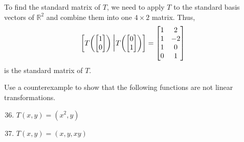 \documentclass{article}
\begin{document}
\begin{enumerate}
\begin{solution}
        To find the standard matrix of \(T\), we need to apply \(T\) to the standard basis vectors of \(\mathbb{R}^2\) and combine them into one \(4\times 2\) matrix. Thus,\[
            \begin{bmatrix}
                T\!\begin{pmatrix}
                    \begin{bmatrix}
                        1\\0
                    \end{bmatrix}
                \end{pmatrix}\scalebox{1.3}{\Big|}T\!\begin{pmatrix}
                    \begin{bmatrix}
                        0\\1
                    \end{bmatrix}
                \end{pmatrix} 
            \end{bmatrix} = \begin{bmatrix}
                1&2\\1&-2\\1&0\\0&1
            \end{bmatrix}
        \] is the standard matrix of \(T\).
    \end{solution}
\end{enumerate}
\begin{center}
    \colorbox{CornflowerBlue!50}{
    \begin{minipage}[c]{0.9\textwidth}
        \centering
        Use a counterexample to show that the following functions are not linear transformations. 
    \end{minipage}
    }
\end{center}
\begin{enumerate}
    \setcounter{enumi}{35}
    \item \(T(x,y) = (x^2,y)\)
    \item \(T(x,y) = (x,y,xy)\)
\end{enumerate}
\pagebreak 
\end{document}
